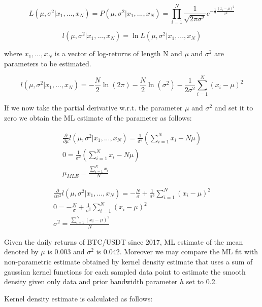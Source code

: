 \begin{equation}
L(\mu,\sigma^2|x_1,...,x_N) = P(\mu,\sigma^2|x_1,...,x_N) = \prod_{i=1}^{N} \frac{1}{\sqrt{2\pi \sigma^2}} e^{-\frac{1}{2} \frac{(x_i-\mu)^2}{\sigma^2}}
\end{equation}

\begin{equation}
l(\mu,\sigma^2|x_1,...,x_N) = \ln L(\mu,\sigma^2|x_1,...,x_N) 
\end{equation}

where $x_1,...,x_N$ is a vector of log-returns of length N and $\mu$ and $\sigma^2$ are parameters to be estimated. 

\begin{equation}
l(\mu,\sigma^2|x_1,...,x_N) = -\frac{N}{2} \ln(2 \pi) - \frac{N}{2} \ln(\sigma^2) - \frac{1}{2 \sigma^2} \sum_{i=1}^{N} (x_i - \mu)^2
\end{equation}

If we now take the partial derivative w.r.t. the parameter $\mu$ and $\sigma^2$ and set it to zero we obtain the ML estimate of the parameter as follows:


\begin{gather} 
\frac{\partial}{\partial \mu} l(\mu,\sigma^2|x_1,...,x_N)  = \frac{1}{\sigma^2} (\sum_{i=1}^{N} x_i - N\mu) \\
0 = \frac{1}{\sigma^2} (\sum_{i=1}^{N} x_i - N\mu) \\
\mu_{MLE} = \frac{\sum_{i=1}^{N} x_i}{N}
\end{gather}

\begin{gather} 
\frac{\partial}{\partial \sigma^2} l(\mu,\sigma^2|x_1,...,x_N) = -\frac{N}{\sigma}+ \frac{1}{\sigma^3} \sum_{i=1}^{N} (x_i - \mu)^2 \\
0 = -\frac{N}{\sigma}+ \frac{1}{\sigma^3} \sum_{i=1}^{N} (x_i - \mu)^2 \\
\sigma^2 = \frac{\sum_{i=1}^{N} (x_i - \mu)^2}{N}
\end{gather}


Given the daily returns of BTC/USDT since 2017, ML estimate of the mean denoted by $\mu$ is 0.003 and $\sigma^2$ is 0.042. Moreover we may compare the ML fit with non-parametric estimate obtained by kernel density estimate that uses a sum of gaussian kernel functions for each sampled data point to estimate the smooth density given only data and prior bandwidth parameter $h$ set to 0.2. 

Kernel density estimate is calculated as follows:

